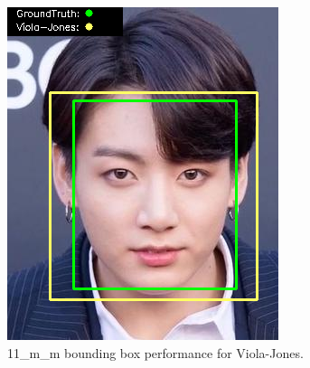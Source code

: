 \documentclass{l4proj}
\begin{document}
\begin{appendices}
\begin{figure}[h!]
\begin{minipage}{0.49\textwidth}
     \includegraphics[width=\textwidth]{images/appendix/viola/11.png}
    \caption{11\_m\_m bounding box performance for Viola-Jones.}
    \label{whoopi_result}
  \end{minipage}
\end{figure}


\end{appendices}
\end{document}
